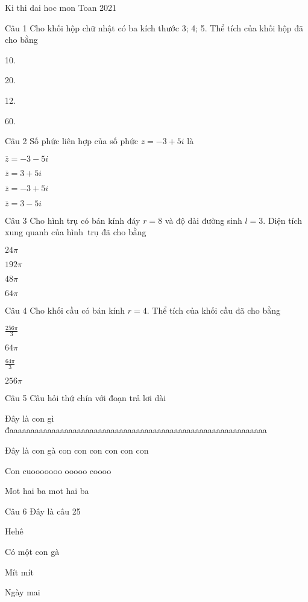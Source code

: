 \documentclass{book}
\begin{document}
\begin{quiz}{Ki thi dai hoc mon Toan 2021}

\begin{multi}[points=1]{Câu 1}
 Cho khối hộp chữ nhật có ba kích thước 3; 4; 5. Thể tích của khối hộp đã cho bằng 
	
\item*  10. 	
\item  20. 	
\item  12. 	
\item  60. 
\end{multi}

\begin{multi}[points=1]{Câu 2}
 Số phức liên hợp của số phức $z=-3+5i$ là 
	
\item  $\overline{z}=-3-5i$	
\item*  $\overline{z}=3+5i$	
\item  $\overline{z}=-3+5i$	
\item  $\overline{z}=3-5i$
\end{multi}

\begin{multi}[points=1]{Câu 3}
 Cho hình trụ có bán kính đáy $r=8$ và độ dài đường sinh $l=3.$ Diện tích xung quanh của hình trụ đã cho bằng 
	
\item  $24\pi $	
\item  $192\pi $	
\item  $48\pi $	
\item*  $64\pi $
\end{multi}

\begin{multi}[points=1]{Câu 4}
 Cho khối cầu có bán kính $r=4.$ Thể tích của khối cầu đã cho bằng 
	
\item*  $\frac{256\pi }{3}$	
\item  $64\pi $	
\item  $\frac{64\pi }{3}$	
\item  $256\pi $
\end{multi}

\begin{multi}[points=1]{Câu 5}
 Câu hỏi thứ chín với đoạn trả lơi dài

\item  Đây là con gì đaaaaaaaaaaaaaaaaaaaaaaaaaaaaaaaaaaaaaaaaaaaaaaaaaaaaaaaaaaaaa	

\item  Đây là con gà con con con con con con	

\item*  Con cuooooooo ooooo coooo

\item  Mot hai ba mot hai ba
\end{multi}

\begin{multi}[points=1]{Câu 6}
 Đây là câu 25

\item Hehê		
\item*  Có một con gà	
\item  Mít mít	
\item  Ngày mai
\end{multi}

\end{quiz}
\end{document}
